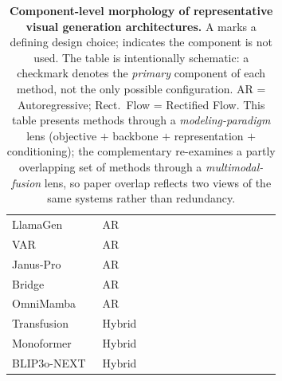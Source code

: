 \documentclass{llmxive}
\providecommand{\cmark}{\ding{52}}
\providecommand{\xmark}{\ding{56}}
\begin{document}
\begin{table}[!htp]
{\begin{tabular}{@{}l l ccc cccc ccccc@{}}
        LlamaGen~\citep{sun2024autoregressive}            & AR           & \xmark & \cmark & \xmark & \xmark & \xmark & \xmark & \cmark & \xmark & \xmark & \xmark & \xmark & \xmark \\
        VAR~\citep{tian2024visual}                        & AR           & \xmark & \cmark & \xmark & \xmark & \xmark & \xmark & \cmark & \xmark & \xmark & \xmark & \xmark & \xmark \\
        Janus-Pro~\citep{chen2025janusprounifiedmultimodalunderstanding} & AR & \xmark & \cmark & \xmark & \xmark & \xmark & \xmark & \cmark & \xmark & \xmark & \xmark & \cmark & \xmark \\
        Bridge~\citep{wang2025bridge}                     & AR           & \xmark & \cmark & \xmark & \xmark & \xmark & \xmark & \cmark & \xmark & \xmark & \xmark & \cmark & \xmark \\
        OmniMamba~\citep{zou2025omnimamba}                & AR           & \xmark & \xmark & \cmark & \xmark & \xmark & \xmark & \cmark & \xmark & \xmark & \xmark & \cmark & \xmark \\
        Transfusion~\citep{zhou2024transfusion}           & Hybrid       & \xmark & \cmark & \xmark & \xmark & \cmark & \xmark & \xmark & \xmark & \xmark & \xmark & \cmark & \xmark \\
        Monoformer~\citep{zhao2024monoformer} & Hybrid & \xmark & \cmark & \xmark & \xmark & \cmark & \xmark & \xmark & \xmark & \xmark & \cmark & \cmark & \xmark \\
        
        BLIP3o-NEXT~\citep{chen2025blip3onext}            & Hybrid       & \xmark & \cmark & \xmark & \xmark & \xmark & \xmark & \cmark & \xmark & \cmark & \xmark & \cmark & \cmark \\
        \bottomrule[1pt]
    \end{tabular}%
}
\caption{\textbf{Component-level morphology of representative visual generation architectures.} A \cmark{} marks a defining design choice; \xmark{} indicates the component is not used. The table is intentionally schematic: a checkmark denotes the \emph{primary} component of each method, not the only possible configuration. AR = Autoregressive; Rect.\ Flow = Rectified Flow. This table presents methods through a \emph{modeling-paradigm} lens (objective $+$ backbone $+$ representation $+$ conditioning); the complementary  re-examines a partly overlapping set of methods through a \emph{multimodal-fusion} lens, so paper overlap reflects two views of the same systems rather than redundancy.}
\label{tab:arch_morphology}
\end{table}
\end{document}
